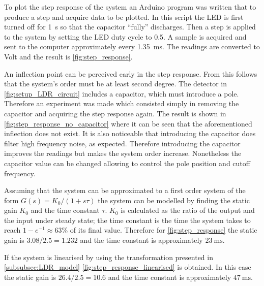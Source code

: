 To plot the step response of the system an Arduino program was written that to produce a step and acquire data to be plotted. In this script the LED is first turned off for \SI{1}{\second} so that the capacitor ``fully'' discharges. Then a step is applied to the system by setting the LED duty cycle to 0.5. A sample is acquired and sent to the computer approximately every \SI{1.35}{\milli\second}. The readings are converted to Volt and the result is \autoref{fig:step_response}.

An inflection point can be perceived early in the step response. From this follows that the system's order must be at least second degree. The detector in \autoref{fig:setup_LDR_circuit} includes a capacitor, which must introduce a pole. Therefore an experiment was made which consisted simply in removing the capacitor and acquiring the step response again. The result is shown in \autoref{fig:step_response_no_capacitor} where it can be seen that the aforementioned inflection does not exist. It is also noticeable that introducing the capacitor does filter high frequency noise, as expected. Therefore introducing the capacitor improves the readings but makes the system order increase. Nonetheless the capacitor value can be changed allowing to control the pole position and cutoff frequency.

Assuming that the system can be approximated to a first order system of the form $G(s) = K_0/(1+s\tau)$ the system can be modelled by finding the static gain $K_0$ and the time constant $\tau$. $K_0$ is calculated as the ratio of the output and the input under steady state; the time constant is the time the system takes to reach $1-e^{-1} \approx 63 \%$ of its final value. Therefore for \autoref{fig:step_response} the static gain is $3.08/2.5 = 1.232$ and the time constant is approximately $\SI{23}{\milli\second}$.

If the system is linearised by using the transformation presented in \ref{subsubsec:LDR_model} \autoref{fig:step_response_linearised} is obtained. In this case the static gain is $26.4/2.5 = 10.6$ and the time constant is approximately $\SI{47}{\milli\second}$.

